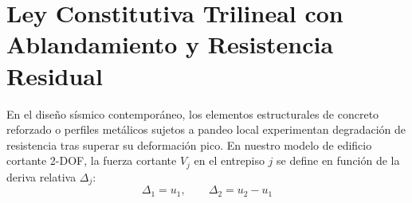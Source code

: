 \documentclass[11pt,letterpaper]{article}
\begin{document}
\section{Ley Constitutiva Trilineal con Ablandamiento y Resistencia Residual}

En el diseño sísmico contemporáneo, los elementos estructurales de concreto reforzado o perfiles metálicos sujetos a pandeo local experimentan degradación de resistencia tras superar su deformación pico. En nuestro modelo de edificio cortante 2-DOF, la fuerza cortante $V_j$ en el entrepiso $j$ se define en función de la deriva relativa $\Delta_j$:
\begin{equation}
    \Delta_1 = u_1, \qquad \Delta_2 = u_2 - u_1
\end{equation}
\end{document}
